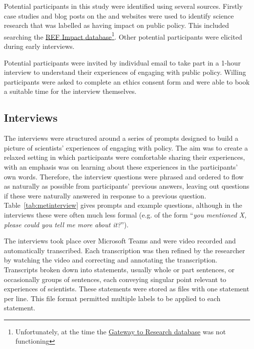 Potential participants in this study were identified using several sources. Firstly case studies and blog posts on the \REF{} and \UKRI{} websites were used to identify \CAN{} science research that was labelled as having impact on public policy. This included searching the \href{https://results2021.ref.ac.uk/impact}{REF Impact database}\footnote{Unfortunately, at the time the \UKRI{} \href{https://gtr.gtr.ukri.org/}{Gateway to Research database} was not functioning}. Other potential participants were elicited during early interviews.

Potential participants were invited by individual email to take part in a 1-hour interview to understand their experiences of engaging with public policy. Willing participants were asked to complete an ethics consent form and were able to book a suitable time for the interview themselves.

\subsection{Interviews}\label{sec:metinterview}

The interviews were structured around a series of prompts designed to build a picture of scientists' experiences of engaging with policy. The aim was to create a relaxed setting in which participants were comfortable sharing their experiences, with an emphasis was on learning about these experiences in the participants' own words. Therefore, the interview questions were phrased and ordered to flow as naturally as possible from participants' previous answers, leaving out questions if these were naturally answered in response to a previous question. Table~\ref{tab:metinterview} gives prompts and example questions, although in the interviews these were often much less formal (e.g. of the form ``\textit{you mentioned X, please could you tell me more about it?}'').

The interviews took place over Microsoft Teams and were video recorded and automatically transcribed. Each transcription was then refined by the researcher by watching the video and correcting and annotating the transcription. Transcripts broken down into statements, usually whole or part sentences, or occasionally groups of sentences, each conveying singular point relevant to experiences of scientists. These statements were stored as \CSV{} files with one statement per line. This file format permitted multiple labels to be applied to each statement.

